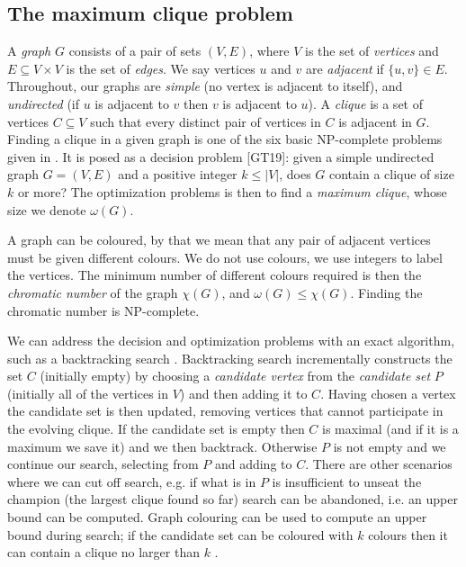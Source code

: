 \documentclass[runningheads]{llncs}
\begin{document}
\subsection{The maximum clique problem}
A \emph{graph} $G$ consists of a pair of sets $(V,E)$, where $V$ is the set of \emph{vertices} and $E \subseteq V \times V$ is the set of \emph{edges}. We say vertices $u$ and $v$ are \emph{adjacent} if $\{u, v\} \in E$. Throughout, our graphs are \emph{simple} (no vertex is adjacent to itself), and \emph{undirected} (if $u$ is adjacent to $v$ then $v$ is adjacent to $u$). A \emph{clique} is a set of vertices $C \subseteq V$ such that every distinct pair of vertices in $C$ is adjacent in $G$.
Finding a clique in a given graph is one of the six basic NP-complete problems given in \cite{gareyJohnson}. It is posed as a decision problem [GT19]: given a simple undirected graph $G = (V,E)$ and a positive integer $k \leq |V|$, does $G$ contain a clique of size $k$ or more? The optimization problems is then to find a \emph{maximum clique}, whose size we denote $\omega(G)$.


A graph can be coloured, by that we mean that any pair of adjacent vertices must be given different colours. We do not use colours, 
we use integers to label the vertices. The minimum number of different colours required is then the
\emph{chromatic number} of the graph $\chi(G)$, and $\omega(G) \leq \chi(G)$. Finding the chromatic number is NP-complete.

We can address the decision and optimization problems with an exact algorithm, 
such as a backtracking search 
\cite{fahle,regin2003,wood97,carraghanPardalos90,pardalosRodgers92,prjo2002,segundo2011,segundo2011b,Konc_Janezic_2007,tomita2003,tomita2010,aaai2010,carmoZuge}.
Backtracking search incrementally constructs the set $C$ (initially empty) by choosing a \emph{candidate vertex}
from  the \emph{candidate set} $P$ (initially all of the vertices in $V$) and then adding it to $C$. 
Having chosen a vertex the candidate set is then updated, removing vertices
that cannot participate in the evolving clique. If the candidate set is empty then $C$ is maximal (and if it is a maximum we save it)
and we then backtrack. Otherwise $P$ is not empty and we continue our search, selecting from $P$ and adding to $C$.
There are other scenarios where we can cut off search, e.g. if what is in $P$ is insufficient
to unseat the champion (the largest clique found so far) search can be abandoned, i.e. an upper bound can be computed.
Graph colouring can be used to compute an upper
bound during search; if the candidate set can be coloured with $k$ colours then it can contain a clique no larger than $k$
\cite{wood97,fahle,segundo2011,Konc_Janezic_2007,tomita2003,tomita2010}. 
\end{document}

